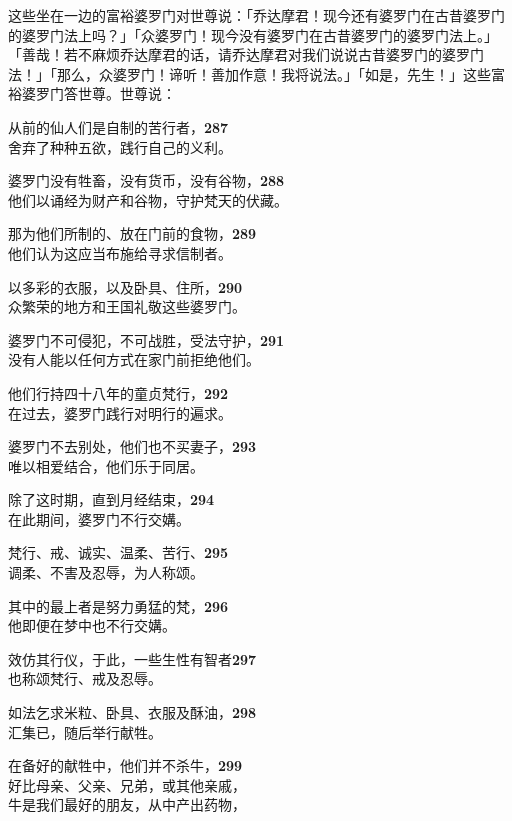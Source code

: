 这些坐在一边的富裕婆罗门对世尊说：「乔达摩君！现今还有婆罗门在古昔婆罗门的婆罗门法上吗？」「众婆罗门！现今没有婆罗门在古昔婆罗门的婆罗门法上。」「善哉！若不麻烦乔达摩君的话，请乔达摩君对我们说说古昔婆罗门的婆罗门法！」「那么，众婆罗门！谛听！善加作意！我将说法。」「如是，先生！」这些富裕婆罗门答世尊。世尊说：


从前的仙人们是自制的苦行者，\hfill{\grayfootnotesize \textbf{287}} \\
舍弃了种种五欲，践行自己的义利。


婆罗门没有牲畜，没有货币，没有谷物，\hfill{\grayfootnotesize \textbf{288}} \\
他们以诵经为财产和谷物，守护梵天的伏藏。


那为他们所制的、放在门前的食物，\hfill{\grayfootnotesize \textbf{289}} \\
他们认为这应当布施给寻求信制者。


以多彩的衣服，以及卧具、住所，\hfill{\grayfootnotesize \textbf{290}} \\
众繁荣的地方和王国礼敬这些婆罗门。


婆罗门不可侵犯，不可战胜，受法守护，\hfill{\grayfootnotesize \textbf{291}} \\
没有人能以任何方式在家门前拒绝他们。


他们行持四十八年的童贞梵行，\hfill{\grayfootnotesize \textbf{292}} \\
在过去，婆罗门践行对明行的遍求。


婆罗门不去别处，他们也不买妻子，\hfill{\grayfootnotesize \textbf{293}} \\
唯以相爱结合，他们乐于同居。


除了这时期，直到月经结束，\hfill{\grayfootnotesize \textbf{294}} \\
在此期间，婆罗门不行交媾。


梵行、戒、诚实、温柔、苦行、\hfill{\grayfootnotesize \textbf{295}} \\
调柔、不害及忍辱，为人称颂。


其中的最上者是努力勇猛的梵，\hfill{\grayfootnotesize \textbf{296}} \\
他即便在梦中也不行交媾。


效仿其行仪，于此，一些生性有智者\hfill{\grayfootnotesize \textbf{297}} \\
也称颂梵行、戒及忍辱。


如法乞求米粒、卧具、衣服及酥油，\hfill{\grayfootnotesize \textbf{298}} \\
汇集已，随后举行献牲。


在备好的献牲中，他们并不杀牛，\hfill{\grayfootnotesize \textbf{299}} \\
好比母亲、父亲、兄弟，或其他亲戚，\\
牛是我们最好的朋友，从中产出药物，


